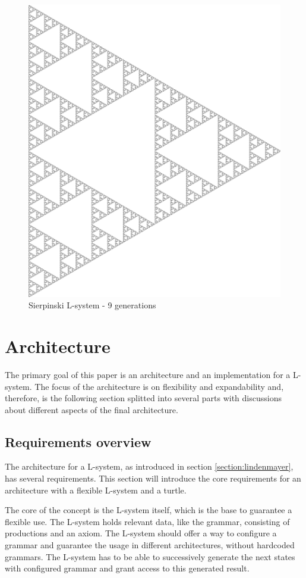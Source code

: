 \documentclass[english]{cpp-hmwk}
\begin{document}
\begin{figure}[h!]
	\centering
	\includegraphics[width=0.6\columnwidth]{../graphs/Examples/sierpinski.png}
	\caption{Sierpinski L-system - 9 generations}
	\label{figure:Sierpinski}
\end{figure}
 
\clearpage
\section{Architecture}
The primary goal of this paper is an architecture and an implementation for a L-system. The focus of the architecture is on flexibility and expandability and, therefore, is the following section splitted into several parts with discussions about different aspects of the final architecture.

\subsection{Requirements overview}
The architecture for a L-system, as introduced in section \ref{section:lindenmayer}, has several requirements. This section will introduce the core requirements for an architecture with a flexible L-system and a turtle.

\medskip
\noindent The core of the concept is the L-system itself, which is the base to guarantee a flexible use. The L-system holds relevant data, like the grammar, consisting of productions and an axiom. The L-system should offer a way to configure a grammar and guarantee the usage in different architectures, without hardcoded grammars. The L-system has to be able to successively generate the next states with configured grammar and grant access to this generated result.
\end{document}
